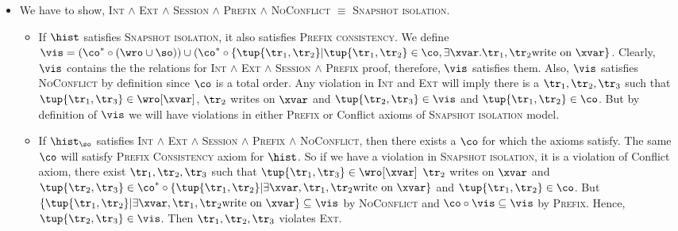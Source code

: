 \begin{itemize}
 \item We have to show, \textsc{Int} $\land$ \textsc{Ext} $\land$ \textsc{Session} $\land$ \textsc{Prefix} $\land$ \textsc{NoConflict} $\equiv$ \textsc{Snapshot isolation}.
       
       \begin{itemize}
        \item If $\hist$ satisfies \textsc{Snapshot isolation}, it also satisfies \textsc{Prefix consistency}. We define $\vis = (\co^* \circ (\wro \cup \so)) \cup (\co^* \circ \{\tup{\tr_1, \tr_2} | \tup{\tr_1, \tr_2} \in \co, \exists \xvar. \tr_1, \tr_2 \text{write on } \xvar \}$. Clearly, $\vis$ contains the the relations for \textsc{Int} $\land$ \textsc{Ext} $\land$ \textsc{Session} $\land$ \textsc{Prefix} proof, therefore, $\vis$ satisfies them. Also, $\vis$ satisfies \textsc{NoConflict} by definition since $\co$ is a total order. Any violation in \textsc{Int} and \textsc{Ext} will imply there is a $\tr_1, \tr_2, \tr_3$ such that $\tup{\tr_1, \tr_3} \in \wro[\xvar]$, $\tr_2$ writes on $\xvar$ and $\tup{\tr_2, \tr_3} \in \vis$ and $\tup{\tr_1, \tr_2} \in \co$. But by definition of $\vis$ we will have violations in either \textsc{Prefix} or \textsf{Conflict} axioms of \textsc{Snapshot isolation} model.
              
        \item If $\hist_{\so}$ satisfies \textsc{Int} $\land$ \textsc{Ext} $\land$ \textsc{Session} $\land$ \textsc{Prefix} $\land$ \textsc{NoConflict}, then there exists a $\co$ for which the axioms satisfy. The same $\co$ will satisfy \textsc{Prefix Consistency} axiom for $\hist$. So if we have a violation in \textsc{Snapshot isolation}, it is a violation of \textsf{Conflict} axiom, \ie there exist $\tr_1, \tr_2, \tr_3$ such that $\tup{\tr_1, \tr_3} \in \wro[\xvar]$ $\tr_2$ writes on $\xvar$ and $\tup{\tr_2, \tr_3} \in \co^* \circ \{\tup{\tr_1, \tr_2} | \exists \xvar, \tr_1, \tr_2 \text{write on } \xvar\}$ and $\tup{\tr_1, \tr_2} \in \co$. But $\{\tup{\tr_1, \tr_2} | \exists \xvar, \tr_1, \tr_2 \text{write on } \xvar\} \subseteq \vis$ by \textsc{NoConflict} and $\co \circ \vis \subseteq \vis$ by \textsc{Prefix}. Hence, $\tup{\tr_2, \tr_3} \in \vis$. Then $\tr_1, \tr_2, \tr_3$ violates \textsc{Ext}.
       \end{itemize}
       
       

\end{itemize}
